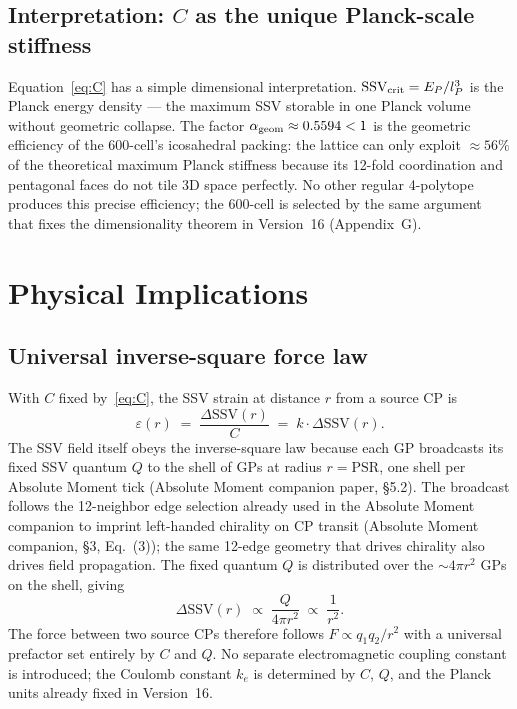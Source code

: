 \documentclass[12pt]{article}
\newcommand{\lP}{l_P}
\newcommand{\EP}{E_P}
\newcommand{\SSV}{\text{SSV}}
\newcommand{\PSR}{\text{PSR}}
\newcommand{\alphageom}{\alpha_{\rm geom}}
\newcommand{\SSVcrit}{\SSV_{\rm crit}}
\begin{document}
\subsection{Interpretation: $C$ as the unique Planck-scale stiffness}

Equation~\eqref{eq:C} has a simple dimensional interpretation.
$\SSVcrit = \EP/\lP^3$ is the Planck energy density --- the maximum
SSV storable in one Planck volume without geometric collapse.
The factor $\alphageom \approx 0.5594 < 1$ is the geometric efficiency
of the 600-cell's icosahedral packing: the lattice can only exploit
$\approx 56\%$ of the theoretical maximum Planck stiffness because its
12-fold coordination and pentagonal faces do not tile 3D space perfectly.
No other regular 4-polytope produces this precise efficiency; the 600-cell
is selected by the same argument that fixes the dimensionality theorem in
Version~16 (Appendix~G).

\section{Physical Implications}
\label{sec:implications}

\subsection{Universal inverse-square force law}

With $C$ fixed by~\eqref{eq:C}, the SSV strain at distance $r$ from a
source CP is
\begin{equation}
  \varepsilon(r) \;=\; \frac{\Delta\SSV(r)}{C}
  \;=\; k\cdot\Delta\SSV(r).
  \label{eq:strain}
\end{equation}
The SSV field itself obeys the inverse-square law because each GP broadcasts
its fixed SSV quantum $Q$ to the shell of GPs at radius $r = \PSR$, one shell
per Absolute Moment tick (Absolute Moment companion paper, \S 5.2).
The broadcast follows the 12-neighbor edge selection already used in the
Absolute Moment companion to imprint left-handed chirality on CP transit
(Absolute Moment companion, \S 3, Eq.~(3)); the same 12-edge geometry that
drives chirality also drives field propagation.
The fixed quantum $Q$ is distributed over the $\sim 4\pi r^2$ GPs on the
shell, giving
\begin{equation}
  \Delta\SSV(r) \;\propto\; \frac{Q}{4\pi r^2}
  \;\propto\; \frac{1}{r^2}.
  \label{eq:invsq}
\end{equation}
The force between two source CPs therefore follows $F \propto q_1 q_2/r^2$
with a universal prefactor set entirely by $C$ and $Q$.  No separate
electromagnetic coupling constant is introduced; the Coulomb constant $k_e$
is determined by $C$, $Q$, and the Planck units already fixed in Version~16.
\end{document}
